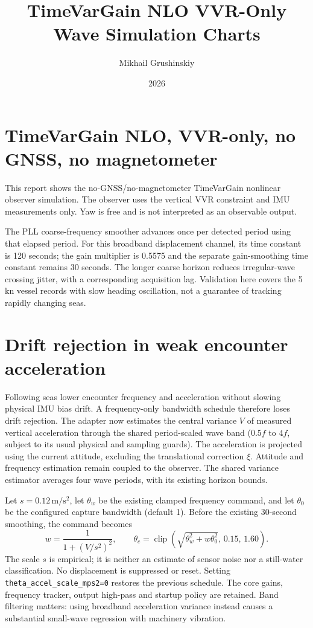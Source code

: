 \documentclass[11pt,letterpaper]{article}
\title{TimeVarGain NLO VVR-Only Wave Simulation Charts}
\author{Mikhail Grushinskiy}
\date{2026}
\begin{document}
\maketitle


\section*{TimeVarGain NLO, VVR-only, no GNSS, no magnetometer}

This report shows the no-GNSS/no-magnetometer TimeVarGain nonlinear observer simulation.
The observer uses the vertical VVR constraint and IMU measurements only. Yaw is free and is not interpreted as an observable output.

The PLL coarse-frequency smoother advances once per detected period using
that elapsed period. For this broadband displacement channel, its time
constant is 120 seconds; the gain multiplier is 0.5575 and the separate
gain-smoothing time constant remains 30 seconds. The longer coarse horizon
reduces irregular-wave crossing jitter, with a corresponding acquisition lag.
Validation here covers the 5 kn vessel records with slow heading oscillation, not a guarantee of tracking
rapidly changing seas.

\section*{Drift rejection in weak encounter acceleration}

Following seas lower encounter frequency and acceleration without slowing
physical IMU bias drift. A frequency-only bandwidth schedule therefore loses
drift rejection. The adapter now estimates the central variance $V$ of measured
vertical acceleration through the shared period-scaled wave band
($0.5 f$ to $4 f$, subject to its usual physical and sampling guards).
The acceleration is projected using the current attitude, excluding the
translational correction $\xi$. Attitude and frequency estimation remain
coupled to the observer. The shared variance estimator averages four wave
periods, with its existing horizon bounds.

Let $s=0.12\,\mathrm{m/s^2}$, let $\theta_w$ be the existing clamped
frequency command, and let $\theta_0$ be the configured capture bandwidth
(default 1). Before the existing 30-second smoothing, the command becomes
\[
 w=\frac{1}{1+(V/s^2)^2},\qquad
 \theta_c=\operatorname{clip}
 \left(\sqrt{\theta_w^2+w\theta_0^2},\,0.15,\,1.60\right).
\]
The scale $s$ is empirical; it is neither an estimate of sensor noise nor a
still-water classification. No displacement is suppressed or reset.
Setting \texttt{theta\_accel\_scale\_mps2=0} restores the previous schedule.
The core gains, frequency tracker, output high-pass and startup policy are
retained. Band filtering matters: using broadband acceleration variance
instead causes a substantial small-wave regression with machinery vibration.
\end{document}
